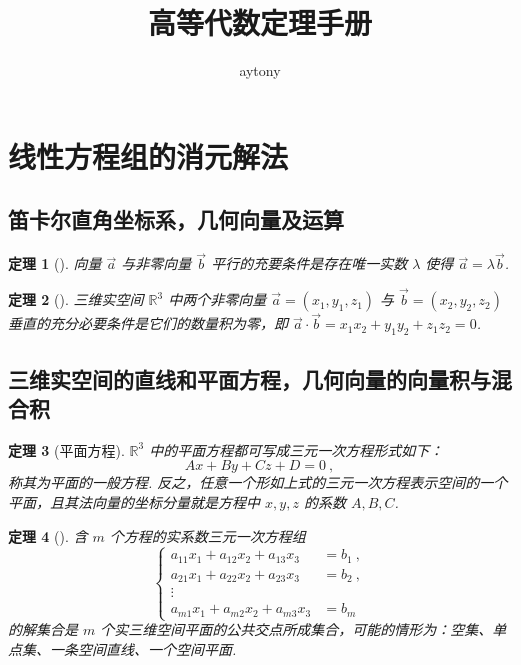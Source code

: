 \documentclass[zihao=-4,UTF8,linespread=1.8,nothm]{aytony_base}
\title{高等代数定理手册}
\author{aytony}
\newtheorem{theorem}{\indent 定理}[subsection]
\begin{document}
\maketitle
\tableofcontents
\newpage

\section{线性方程组的消元解法}

\subsection{笛卡尔直角坐标系，几何向量及运算}

\begin{theorem}[]
    向量 $\vec{a}$ 与非零向量 $\vec{b}$ 平行的充要条件是存在唯一实数 $\lambda$ 使得 $\vec{a} = \lambda \vec{b}$.
\end{theorem}

\begin{theorem}[]
    三维实空间 $\mathbb{R}^3$ 中两个非零向量 $\vec{a} = (x_1, y_1, z_1)$ 与 $\vec{b} = (x_2, y_2, z_2)$ 垂直的充分必要条件是它们的数量积为零，即 $\vec{a} \cdot \vec{b} = x_1x_2 + y_1y_2 + z_1z_2 = 0$.
\end{theorem}

\subsection{三维实空间的直线和平面方程，几何向量的向量积与混合积}

\begin{theorem}[平面方程]
    $\mathbb{R}^3$ 中的平面方程都可写成三元一次方程形式如下：$$
        Ax+By+Cz+D=0\ ,
    $$ 称其为平面的一般方程. 反之，任意一个形如上式的三元一次方程表示空间的一个平面，且其法向量的坐标分量就是方程中 $x, y, z$ 的系数 $A, B, C$.
\end{theorem}

\begin{theorem}[]
    含 $m$ 个方程的实系数三元一次方程组 $$
        \left\{
        \begin{aligned}
            a_{11}x_1+a_{12}x_2 + a_{13}x_3 & = b_1\ , \\
            a_{21}x_1+a_{22}x_2 + a_{23}x_3 & = b_2\ , \\
            \vdots                                     \\
            a_{m1}x_1+a_{m2}x_2 + a_{m3}x_3 & = b_m
        \end{aligned}
        \right.
    $$ 的解集合是 $m$ 个实三维空间平面的公共交点所成集合，可能的情形为：空集、单点集、一条空间直线、一个空间平面.
\end{theorem}
\end{document}
